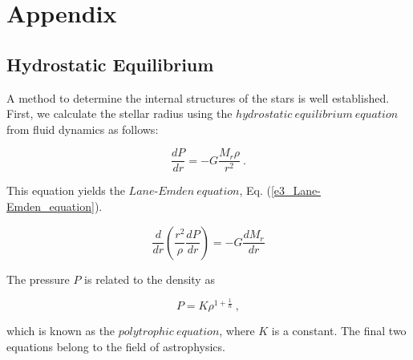 \documentclass[%
 reprint,
 amsmath,amssymb,
 aps,
]{revtex4-1}
\numberwithin{equation}{section}%
\begin{document}
\section{Appendix}
\label{Appendix}

\subsection{Hydrostatic Equilibrium}
\label{Hydrostatic_Equilibrium}

    A method to determine the internal structures of the stars is well established. First, we calculate the stellar radius using the $hydrostatic \ equilibrium \ equation$ \cite{Bradley Carroll} from  fluid dynamics as follows:
        
        \begin{equation}
            \frac{d P}{d r} = -G \frac{M_{r} \rho}{r^{2}}
            \ .
            \label{e3_hydrostatic_equilibrium_equation}
        \end{equation}

    This equation yields the $Lane$-$Emden \ equation$, Eq. (\ref{e3_Lane-Emden_equation}).
        
        \begin{equation}
            \frac{d}{d r} \left( \frac{r^{2}}{\rho} \frac{d P}{d r} \right) = -G \frac{d M_{r}}{d r}
            \label{e3_Lane-Emden_equation}
        \end{equation}

    The pressure $P$ is related to the density as
        
        \begin{equation}
            P = K \rho^{1 + \frac{1}{n}}
            \ ,
            \label{e3_polytropic_equation}
        \end{equation}
        
    \noindent
    which is known as the $polytrophic \ equation$, where $K$ is a constant.  The final two equations belong to the field of astrophysics.
\end{document}

